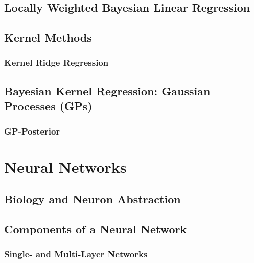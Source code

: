 		\subsection{Locally Weighted Bayesian Linear Regression} %

		\subsection{Kernel Methods} %

			\subsubsection{Kernel Ridge Regression} %

		\subsection{Bayesian Kernel Regression: Gaussian Processes (GPs)} %

			\subsubsection{GP-Posterior} %

	\section{Neural Networks} %

		\subsection{Biology and Neuron Abstraction} %

		\subsection{Components of a Neural Network} %

			\subsubsection{Single- and Multi-Layer Networks} %

